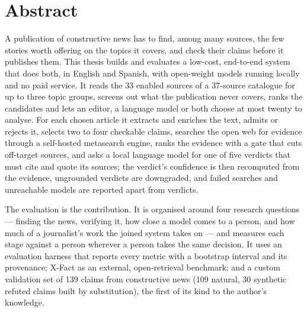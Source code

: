 
\chapter*{Abstract}

A publication of constructive news has to find, among many sources,
the few stories worth offering on the topics it covers, and check their
claims before it publishes them. This thesis builds and evaluates a
low-cost, end-to-end system that does both, in English and Spanish,
with open-weight models running locally and no paid service. It reads
the 33 enabled sources of a 37-source catalogue for up to three topic
groups, screens out
what the publication never covers, ranks the candidates and lets an
editor, a language model or both choose at most twenty to analyse. For
each chosen article it extracts and enriches the text, admits or
rejects it, selects two to four checkable claims, searches the open web
for evidence through a self-hosted metasearch engine, ranks the
evidence with a gate that cuts off-target sources, and asks a local
language model for one of five verdicts that must cite and quote its
sources; the verdict's confidence is then recomputed from the evidence,
ungrounded verdicts are downgraded, and failed searches and unreachable
models are reported apart from verdicts.

The evaluation is the contribution. It is organised around four
research questions --- finding the news, verifying it, how close a
model comes to a person, and how much of a journalist's work the joined
system takes on --- and measures each stage against a person wherever a
person takes the same decision. It uses an evaluation harness that
reports every metric with a bootstrap interval and its provenance;
X-Fact as an external, open-retrieval benchmark; and a custom
validation set of 139 claims from constructive news (109 natural, 30
synthetic refuted claims built by substitution), the first of its
kind to the author's knowledge.

